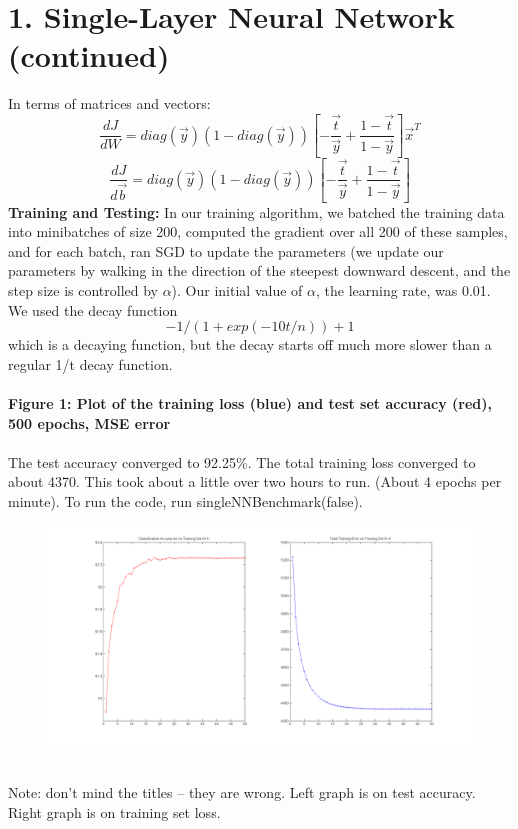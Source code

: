 \documentclass[11pt]{article}
\begin{document}
\section*{1. Single-Layer Neural Network (continued)}
In terms of matrices and vectors:
$$ \boxed{\frac{dJ} {dW} = diag(\vec{y}) (1 - diag(\vec{y})) [ - \frac{\vec{t}}{\vec{y}} + \frac{ 1 - \vec{t}}{1 - \vec{y}} ] \vec{x}^T} $$
$$ \boxed{\frac{dJ} {d\vec{b}} = diag(\vec{y}) (1 - diag(\vec{y})) [ - \frac{\vec{t}}{\vec{y}} + \frac{ 1 - \vec{t}}{1 - \vec{y}} ]} $$
\textbf{Training and Testing:}
In our training algorithm, we batched the training data into minibatches of size 200, computed the gradient over all 200 of these samples, and for each batch, ran SGD to update the parameters (we update our parameters by walking in the direction of the steepest downward descent, and the step size is controlled by $\alpha$). Our initial value of $\alpha$, the learning rate, was 0.01. We used the decay function $$ -1 / (1 + exp(-10t / n)) + 1 $$ which is a decaying function, but the decay starts off much more slower than a regular 1/t decay function.
\\\\
\textbf{Figure 1: Plot of the training loss (blue) and test set accuracy (red), 500 epochs, MSE error}  \\\\
The test accuracy converged to 92.25\%. The total training loss converged to about 4370. This took about a little over two hours to run. (About 4 epochs per minute). To run the code, run singleNNBenchmark(false).
\\
\begin{figure}[ht!]
\centering
\includegraphics[width=180mm]{plots/finalp1mse.png}
\label{overflow}
\end{figure}
\\
Note: don't mind the titles -- they are wrong. Left graph is on test accuracy. Right graph is on training set loss.
\\
\newpage
\end{document}
